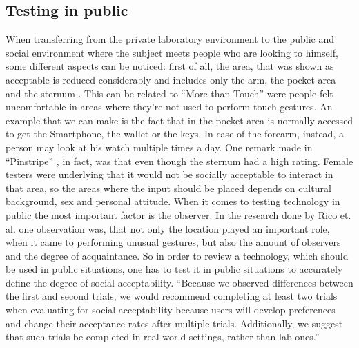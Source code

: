 \documentclass{sigchi}
\begin{document}
\subsection{Testing in public}
%
When transferring from the private laboratory environment to the public and social environment where the subject meets people who are looking to himself, some different aspects can be noticed: first of all, the area, that was shown as acceptable is reduced considerably and includes only the arm, the pocket area and the sternum \cite{pinstripe}. This can be related to ``More than Touch''  \cite{more-touch} were people felt uncomfortable in areas where they’re not used to perform touch gestures. An example that we can make is the fact that in the pocket area is normally accessed to get the Smartphone, the wallet or the keys. In case of the forearm, instead, a person may look at his watch multiple times a day. One remark made in ``Pinstripe'' \cite{pinstripe}, in fact, was that even though the sternum had a high rating. Female testers were underlying that it would not be socially acceptable to interact in that area, so the areas where the input should be placed depends on cultural background, sex and personal attitude.
When it comes to testing technology in public the most important factor is the observer. In the research done by Rico et. al. \cite{usable-gesture} one observation was, that not only the location played an important role, when it came to performing unusual gestures, but also the amount of observers and the degree of acquaintance. So in order to review a technology, which should be used in public situations, one has to test it in public situations to accurately define the degree of social acceptability.
“Because we observed differences between the first and second trials, we would recommend completing at least two trials when evaluating for social acceptability because users will develop preferences and change their acceptance rates after multiple trials. Additionally, we suggest that such trials be completed in real world settings, rather than lab ones.” \cite[p. 9]{usable-gesture}%
\end{document}
